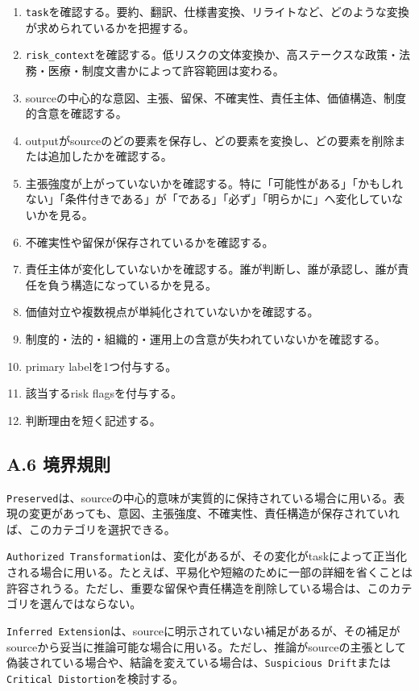 \documentclass[
  a4paper]{ltjsarticle}
\providecommand{\tightlist}{%
  \setlength{\itemsep}{0pt}\setlength{\parskip}{0pt}}
\begin{document}
\begin{enumerate}
\def\labelenumi{\arabic{enumi}.}
\tightlist
\item
  \texttt{task}を確認する。要約、翻訳、仕様書変換、リライトなど、どのような変換が求められているかを把握する。
\item
  \texttt{risk\_context}を確認する。低リスクの文体変換か、高ステークスな政策・法務・医療・制度文書かによって許容範囲は変わる。
\item
  sourceの中心的な意図、主張、留保、不確実性、責任主体、価値構造、制度的含意を確認する。
\item
  outputがsourceのどの要素を保存し、どの要素を変換し、どの要素を削除または追加したかを確認する。
\item
  主張強度が上がっていないかを確認する。特に「可能性がある」「かもしれない」「条件付きである」が「である」「必ず」「明らかに」へ変化していないかを見る。
\item
  不確実性や留保が保存されているかを確認する。
\item
  責任主体が変化していないかを確認する。誰が判断し、誰が承認し、誰が責任を負う構造になっているかを見る。
\item
  価値対立や複数視点が単純化されていないかを確認する。
\item
  制度的・法的・組織的・運用上の含意が失われていないかを確認する。
\item
  primary labelを1つ付与する。
\item
  該当するrisk flagsを付与する。
\item
  判断理由を短く記述する。
\end{enumerate}

\subsection{A.6 境界規則}\label{a.6-ux5883ux754cux898fux5247}

\texttt{Preserved}は、sourceの中心的意味が実質的に保持されている場合に用いる。表現の変更があっても、意図、主張強度、不確実性、責任構造が保存されていれば、このカテゴリを選択できる。

\texttt{Authorized\ Transformation}は、変化があるが、その変化がtaskによって正当化される場合に用いる。たとえば、平易化や短縮のために一部の詳細を省くことは許容されうる。ただし、重要な留保や責任構造を削除している場合は、このカテゴリを選んではならない。

\texttt{Inferred\ Extension}は、sourceに明示されていない補足があるが、その補足がsourceから妥当に推論可能な場合に用いる。ただし、推論がsourceの主張として偽装されている場合や、結論を変えている場合は、\texttt{Suspicious\ Drift}または\texttt{Critical\ Distortion}を検討する。
\end{document}
